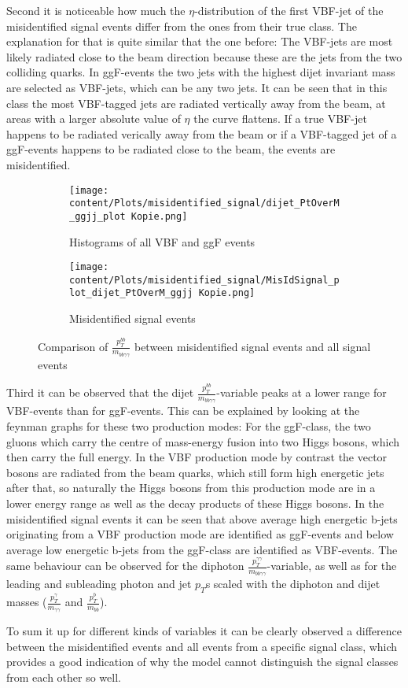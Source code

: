 Second it is noticeable how much the $\eta$-distribution of the first VBF-jet of the misidentified signal events differ from the ones from their true class. The explanation for that is quite similar that the one before:
The VBF-jets are most likely radiated close to the beam direction because these are the jets from the two colliding quarks. In ggF-events the two jets with the highest dijet invariant mass are
selected as VBF-jets, which can be any two jets. It can be seen that in this class the most VBF-tagged jets are radiated vertically away from the beam, at areas with a larger absolute value of $\eta$ the curve flattens.
If a true VBF-jet happens to be radiated verically away from the beam or if a VBF-tagged jet of a ggF-events happens to be radiated close to the beam, the events are misidentified.

\begin{figure}[H]
    \centering
    \begin{subfigure}{0.45\textwidth}
        \centering
        \texttt{[image: content/Plots/misidentified\_signal/dijet\_PtOverM\_ggjj\_plot Kopie.png]}
        \caption{Histograms of all VBF and ggF events}
        \label{fig:roc1}
    \end{subfigure}
    \hfill
    \begin{subfigure}{0.45\textwidth}
        \centering
        \texttt{[image: content/Plots/misidentified\_signal/MisIdSignal\_plot\_dijet\_PtOverM\_ggjj Kopie.png]}
        \caption{Misidentified signal events}
        \label{fig:roc2}
    \end{subfigure}
    \caption{Comparison of $\frac{p_T^{bb}}{m_{bb \gamma \gamma}}$ between misidentified signal events and all signal events}
    \label{fig:combined_roc}
\end{figure}

Third it can be observed that the dijet $\frac{p_T^{bb}}{m_{bb \gamma \gamma}}$-variable peaks at a lower range for VBF-events than for ggF-events. This can be explained by looking at the 
feynman graphs for these two production modes: For the ggF-class, the two gluons which carry the centre of mass-energy fusion into two Higgs bosons, which then carry the full energy. In the VBF
production mode by contrast the vector bosons are radiated from the beam quarks, which still form high energetic jets after that, so naturally the Higgs bosons from this production mode
are in a lower energy range as well as the decay products of these Higgs bosons. In the misidentified signal events it can be seen that above average high energetic b-jets originating from a VBF production mode
are identified as ggF-events and below average low energetic b-jets from the ggF-class are identified as VBF-events. The same behaviour can be observed for the diphoton $\frac{p_T^{\gamma \gamma}}{m_{bb \gamma \gamma}}$-variable,
as well as for the leading and subleading photon and jet $p_T$s scaled with the diphoton and dijet masses ($\frac{p_T^{\gamma}}{m_{\gamma \gamma}}$ and $\frac{p_T^{b}}{m_{bb}}$).

To sum it up for different kinds of variables it can be clearly observed a difference between the misidentified events and all events from a specific signal class, 
which provides a good indication of why the model cannot distinguish the signal classes from each other so well.